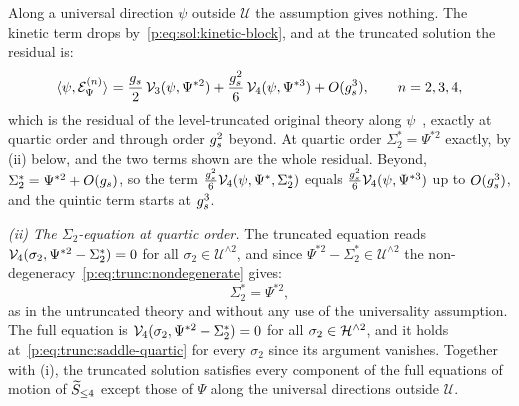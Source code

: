 Along a universal direction $\psi$ outside $\mathcal U$ the assumption gives nothing.
The kinetic term drops by~\eqref{p:eq:sol:kinetic-block}, and at the truncated solution the residual is:
\begin{equation}
\label{p:eq:trunc:level-residual}
\pair{\psi}{\mathcal E^{(n)}_\Psi}
  = \frac{\gs}{2} \, \vertex{3}(\psi, \Psi^{* 2})
    + \frac{\gs^2}{6} \, \vertex{4}(\psi, \Psi^{* 3})
    + O(\gs^3),
\qquad
n = 2, 3, 4,
\end{equation}
which is the residual of the level-truncated original theory along $\psi$~\cite{Yang:2005:ClosedStringTachyon}, exactly at quartic order and through order $\gs^2$ beyond.
At quartic order $\Sigma_2^* = \Psi^{* 2}$ exactly, by (ii) below, and the two terms shown are the whole residual.
Beyond, $\Sigma_2^* = \Psi^{* 2} + O(\gs)$, so the term $\tfrac{\gs^2}{6} \vertex{4}(\psi, \Psi^*, \Sigma_2^*)$ equals $\tfrac{\gs^2}{6} \vertex{4}(\psi, \Psi^{* 3})$ up to $O(\gs^3)$, and the quintic term starts at $\gs^3$.

\emph{(ii) The $\Sigma_2$-equation at quartic order.}
The truncated equation reads $\vertex{4}(\sigma_2, \Psi^{* 2} - \Sigma_2^*) = 0$ for all $\sigma_2 \in \mathcal U^{\wedge 2}$, and since $\Psi^{* 2} - \Sigma_2^* \in \mathcal U^{\wedge 2}$ the non-degeneracy~\eqref{p:eq:trunc:nondegenerate} gives:
\begin{equation}
\label{p:eq:trunc:saddle-quartic}
\Sigma_2^*
  = \Psi^{* 2},
\end{equation}
as in the untruncated theory and without any use of the universality assumption.
The full equation is $\vertex{4}(\sigma_2, \Psi^{* 2} - \Sigma_2^*) = 0$ for all $\sigma_2 \in \Hn{2}$, and it holds at~\eqref{p:eq:trunc:saddle-quartic} for every $\sigma_2$ since its argument vanishes.
Together with (i), the truncated solution satisfies every component of the full equations of motion of $\caction[\le 4]$ except those of $\Psi$ along the universal directions outside $\mathcal U$.

